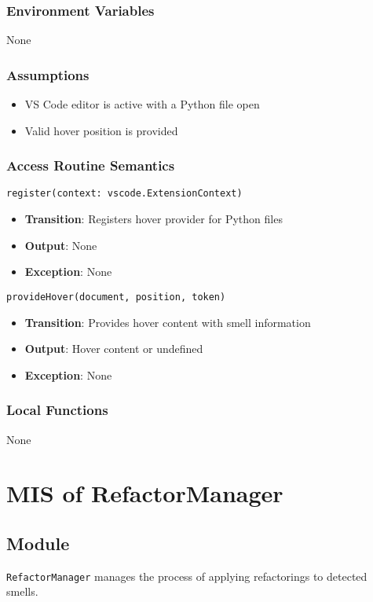 \documentclass[12pt, titlepage]{article}
\begin{document}
\subsubsection{Environment Variables}
None

\subsubsection{Assumptions}
\begin{itemize}
\item VS Code editor is active with a Python file open
\item Valid hover position is provided
\end{itemize}

\subsubsection{Access Routine Semantics}
\texttt{register(context: vscode.ExtensionContext)}
\begin{itemize}
\item \textbf{Transition}: Registers hover provider for Python files
\item \textbf{Output}: None
\item \textbf{Exception}: None
\end{itemize}

\texttt{provideHover(document, position, token)}
\begin{itemize}
\item \textbf{Transition}: Provides hover content with smell information
\item \textbf{Output}: Hover content or undefined
\item \textbf{Exception}: None
\end{itemize}

\subsubsection{Local Functions}
None

\section{MIS of RefactorManager}

\subsection{Module}
\texttt{RefactorManager} manages the process of applying refactorings to detected smells.
\end{document}
